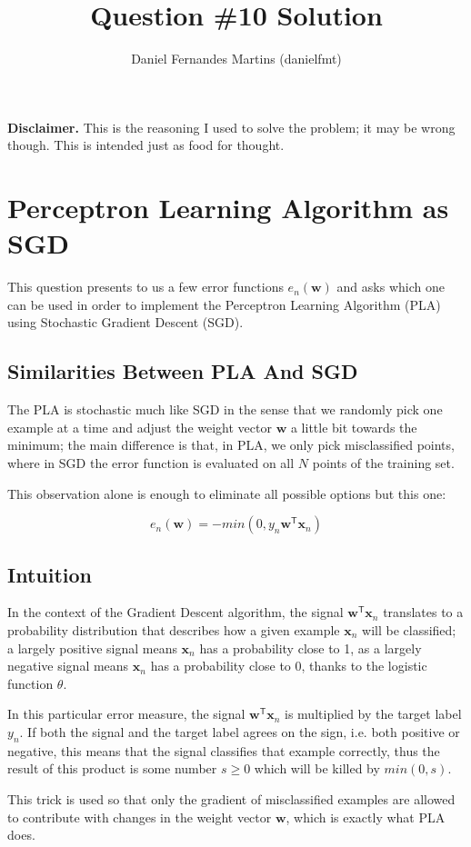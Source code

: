 \documentclass{article}
\author{Daniel Fernandes Martins (danielfmt)}
\title{Question \#10 Solution}
\begin{document}
\maketitle

\textbf{Disclaimer.} This is the reasoning I used to solve the problem; it
may be wrong though. This is intended just as food for thought.

\section{Perceptron Learning Algorithm as SGD}

This question presents to us a few error functions $e_n(\mathbf{w})$ and asks
which one can be used in order to implement the Perceptron Learning Algorithm
(PLA) using Stochastic Gradient Descent (SGD).

\subsection{Similarities Between PLA And SGD}

The PLA is stochastic much like SGD in the sense that we randomly pick one
example at a time and adjust the weight vector $\mathbf{w}$ a little bit towards
the minimum; the main difference is that, in PLA, we only pick misclassified
points, where in SGD the error function is evaluated on all $N$ points of the
training set.

This observation alone is enough to eliminate all possible options but this one:

\begin{equation*}
  e_n(\mathbf{w}) = -min(0, y_n\mathbf{w}^\mathsf{T} \mathbf{x}_n)
\end{equation*}

\subsection{Intuition}

In the context of the Gradient Descent algorithm, the signal
$\mathbf{w}^\mathsf{T}\mathbf{x}_n$ translates to a probability distribution
that describes how a given example $\mathbf{x}_n$ will be classified; a largely
positive signal means $\mathbf{x}_n$ has a probability close to 1, as a largely
negative signal means $\mathbf{x}_n$ has a probability close to 0, thanks to the
logistic function $\theta$.

In this particular error measure, the signal $\mathbf{w}^\mathsf{T}\mathbf{x}_n$
is multiplied by the target label $y_n$. If both the signal and the target
label agrees on the sign, i.e. both positive or negative, this means that the
signal classifies that example correctly, thus the result of this product is
some number $s \geq 0$ which will be killed by $min(0, s)$.

This trick is used so that only the gradient of misclassified examples are
allowed to contribute with changes in the weight vector $\mathbf{w}$,
which is exactly what PLA does.
\end{document}

